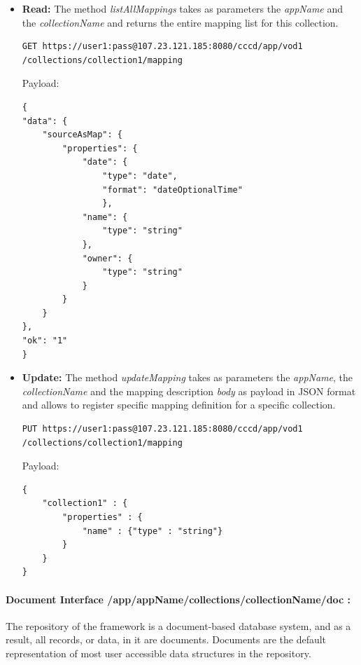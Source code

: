 \begin{itemize}

\item \textbf{Read:} The method \textit{listAllMappings} takes as parameters the \textit{appName} and the \textit{collectionName} and returns the entire mapping list for this collection.

\begin{code}
\begin{verbatim}
GET https://user1:pass@107.23.121.185:8080/cccd/app/vod1
/collections/collection1/mapping
\end{verbatim}
Payload:
\begin{verbatim}
{
"data": {
	"sourceAsMap": {
		"properties": {
			"date": {
				"type": "date",
				"format": "dateOptionalTime"
				},
			"name": {
				"type": "string"
			},
			"owner": {
				"type": "string"
			}
		}
	}
},
"ok": "1"
}

\end{verbatim}
\end{code}

\item \textbf{Update:} The method \textit{updateMapping} takes as parameters the \textit{appName}, the \textit{collectionName} and the mapping description \textit{body} as payload in \ac{JSON} format and allows to register specific mapping definition for a specific collection.

\begin{code}
\begin{verbatim}
PUT https://user1:pass@107.23.121.185:8080/cccd/app/vod1
/collections/collection1/mapping
\end{verbatim}
Payload:
\begin{verbatim}
{
	"collection1" : {
		"properties" : {
			"name" : {"type" : "string"}
		}
	}
}
\end{verbatim}
\end{code}

\end{itemize}


\paragraph{Document Interface /app/{appName}/collections/{collectionName}/doc :} The repository of the framework is a document-based database system, and as a result, all records, or data, in it are documents. Documents are the default representation of most user accessible data structures in the repository.

